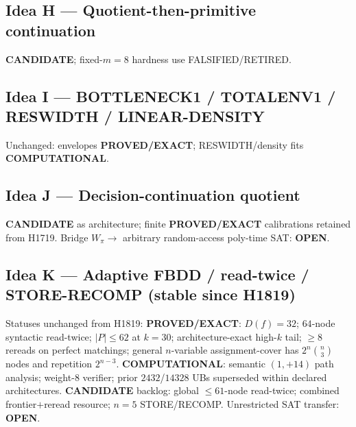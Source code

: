 \documentclass[11pt]{article}
\begin{document}
\subsection*{Idea H --- Quotient-then-primitive continuation}
\textbf{CANDIDATE}; fixed-$m=8$ hardness use FALSIFIED/RETIRED.

\subsection*{Idea I --- BOTTLENECK1 / TOTALENV1 / RESWIDTH / LINEAR-DENSITY}
Unchanged: envelopes \textbf{PROVED/EXACT}; RESWIDTH/density fits \textbf{COMPUTATIONAL}.

\subsection*{Idea J --- Decision-continuation quotient}
\textbf{CANDIDATE} as architecture; finite \textbf{PROVED/EXACT} calibrations retained from H1719.
Bridge $W_\pi\to$ arbitrary random-access poly-time SAT: \textbf{OPEN}.

\subsection*{Idea K --- Adaptive FBDD / read-twice / STORE-RECOMP (stable since H1819)}
Statuses unchanged from H1819:
\textbf{PROVED/EXACT}: $D(f)=32$; $64$-node syntactic read-twice; $|P|\le62$ at $k=30$;
architecture-exact high-$k$ tail; $\ge8$ rereads on perfect matchings; general
$n$-variable assignment-cover has $2^n\binom{n}{3}$ nodes and repetition $2^{n-3}$.
\textbf{COMPUTATIONAL}: semantic $(1,+14)$ path analysis; weight-$8$ verifier;
prior $2432$/$14328$ UBs superseded within declared architectures.
\textbf{CANDIDATE} backlog: global $\le61$-node read-twice; combined frontier$+$reread resource;
$n=5$ STORE/RECOMP.
Unrestricted SAT transfer: \textbf{OPEN}.
\end{document}
